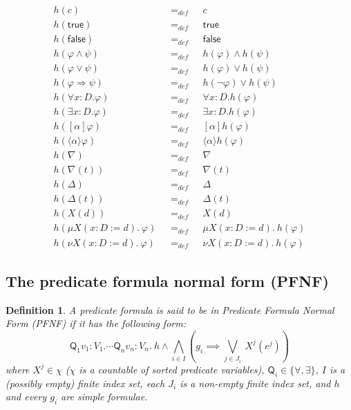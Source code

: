 \documentclass{article}
\newtheorem{definition}[theorem]{Definition}
\begin{document}
\begin{equation*}
\begin{array}{lll}
h(c) & =_{def} & c \\
h(\mathsf{true}) & =_{def} & \mathsf{true} \\
h(\mathsf{false}) & =_{def} & \mathsf{false} \\
h(\varphi \wedge \psi ) & =_{def} & h(\varphi )\wedge h(\psi ) \\
h(\varphi \vee \psi ) & =_{def} & h(\varphi )\vee h(\psi ) \\
h(\varphi \Rightarrow \psi ) & =_{def} & h(\lnot \varphi )\vee h(\psi ) \\
h(\forall {x{:}D}.\varphi ) & =_{def} & \forall {x{:}D}.h(\varphi ) \\
h(\exists {x{:}D}.\varphi ) & =_{def} & \exists {x{:}D}.h(\varphi ) \\
h([\alpha ]\varphi ) & =_{def} & [\alpha ]h(\varphi ) \\
h(\langle \alpha \rangle \varphi ) & =_{def} & \langle \alpha \rangle
h(\varphi ) \\
h(\nabla ) & =_{def} & \nabla \\
h(\nabla (t)) & =_{def} & \nabla (t) \\
h(\Delta ) & =_{def} & \Delta \\
h(\Delta (t)) & =_{def} & \Delta (t) \\
h(X(d)) & =_{def} & X(d) \\
h(\mu X(x{:}D:=d).~\varphi )~~~ & =_{def}~~~ & \mu X(x{:}D:=d).~h(\varphi )
\\
h(\nu X(x{:}D:=d).~\varphi )~~~ & =_{def}~~~ & \nu X(x{:}D:=d).~h(\varphi )%
\end{array}%
\end{equation*}%
\pagebreak


\subsection{The predicate formula normal form (PFNF)}

\begin{definition}
A predicate formula is said to be in \emph{Predicate Formula Normal Form}
(PFNF) if it has the following form:
\begin{equation*}
\mathsf{Q}_{1}v_{1}{:}V_{1}.\cdots \mathsf{Q}_{n}v_{n}{:}V_{n}.~h\wedge
\bigwedge\limits_{i\in I}\left( g_{i}\implies \bigvee\limits_{j\in
J_{i}}~X^{j}(e^{j})\right)
\end{equation*}%
where $X^{j}\in \chi $ ($\chi $ is a countable of sorted predicate
variables), $\mathsf{Q}_{i}\in \{\forall ,\exists \}$, $I$ is a (possibly
empty) finite index set, each $J_{i}$ is a non-empty finite index set, and $h
$ and every $g_{i}$ are simple formulae.
\end{definition}
\end{document}
